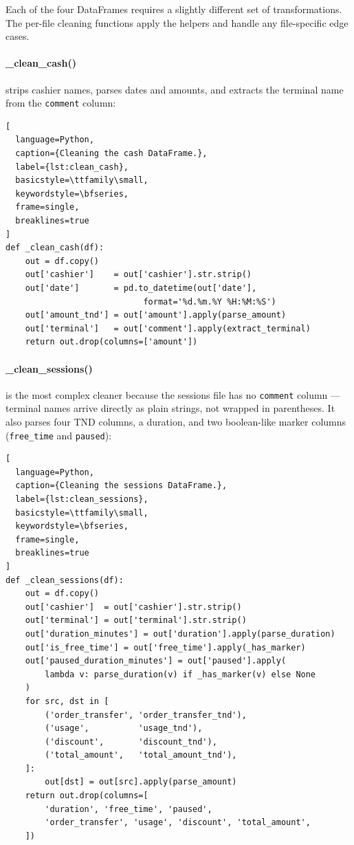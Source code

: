 Each of the four DataFrames requires a slightly different set of transformations.
The per-file cleaning functions apply the helpers and handle any file-specific
edge cases.

\paragraph{\_clean\_cash()} strips cashier names, parses dates and amounts, and
extracts the terminal name from the \texttt{comment} column:

\begin{lstlisting}[
  language=Python,
  caption={Cleaning the cash DataFrame.},
  label={lst:clean_cash},
  basicstyle=\ttfamily\small,
  keywordstyle=\bfseries,
  frame=single,
  breaklines=true
]
def _clean_cash(df):
    out = df.copy()
    out['cashier']    = out['cashier'].str.strip()
    out['date']       = pd.to_datetime(out['date'],
                            format='%d.%m.%Y %H:%M:%S')
    out['amount_tnd'] = out['amount'].apply(parse_amount)
    out['terminal']   = out['comment'].apply(extract_terminal)
    return out.drop(columns=['amount'])
\end{lstlisting}

\paragraph{\_clean\_sessions()} is the most complex cleaner because the sessions
file has no \texttt{comment} column — terminal names arrive directly as plain
strings, not wrapped in parentheses. It also parses four TND columns, a duration,
and two boolean-like marker columns (\texttt{free\_time} and \texttt{paused}):

\begin{lstlisting}[
  language=Python,
  caption={Cleaning the sessions DataFrame.},
  label={lst:clean_sessions},
  basicstyle=\ttfamily\small,
  keywordstyle=\bfseries,
  frame=single,
  breaklines=true
]
def _clean_sessions(df):
    out = df.copy()
    out['cashier']  = out['cashier'].str.strip()
    out['terminal'] = out['terminal'].str.strip()
    out['duration_minutes'] = out['duration'].apply(parse_duration)
    out['is_free_time'] = out['free_time'].apply(_has_marker)
    out['paused_duration_minutes'] = out['paused'].apply(
        lambda v: parse_duration(v) if _has_marker(v) else None
    )
    for src, dst in [
        ('order_transfer', 'order_transfer_tnd'),
        ('usage',          'usage_tnd'),
        ('discount',       'discount_tnd'),
        ('total_amount',   'total_amount_tnd'),
    ]:
        out[dst] = out[src].apply(parse_amount)
    return out.drop(columns=[
        'duration', 'free_time', 'paused',
        'order_transfer', 'usage', 'discount', 'total_amount',
    ])
\end{lstlisting}

